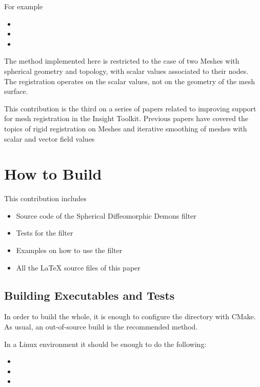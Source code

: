\documentclass{InsightArticle}
\begin{document}
For example

\begin{itemize}
\item {}
\item {}
\item {}
\end{itemize}

The method implemented here is restricted to the case of two Meshes with
spherical geometry and topology, with scalar values associated to their nodes.
The registration operates on the scalar values, not on the geometry of the mesh
surface.

This contribution is the third on a series of papers related to improving
support for mesh registration in the Insight Toolkit. Previous papers have
covered the topics of rigid registration on Meshes and iterative smoothing of
meshes with scalar and vector field
values~\cite{MeshSmoothingIJ2009,MeshRigidRegistrationIJ2009} 

\section{How to Build}

This contribution includes

\begin{itemize}
\item Source code of the Spherical Diffeomorphic Demons filter
\item Tests for the filter
\item Examples on how to use the filter
\item All the LaTeX source files of this paper
\end{itemize}

\subsection{Building Executables and Tests}

In order to build the whole, it is enough to configure the directory with
CMake. As usual, an out-of-source build is the recommended method.

In a Linux environment it should be enough to do the following:

\begin{itemize}
\item {}
\item {}
\item {}
\end{itemize}
\end{document}
